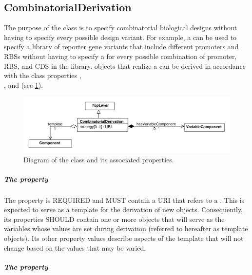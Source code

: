\subsection{CombinatorialDerivation}
\label{sec:CombinatorialDerivation}

The purpose of the  class is to specify combinatorial biological designs without having to specify every possible design variant. For example, a  can be used to specify a library of reporter gene variants that include different promoters and RBSs without having to specify a  for every possible combination of promoter, RBS, and CDS in the library.  objects that realize a  can be derived in accordance with the class properties , \\
, and  (see \ref{uml:combinatorial_derivation}).

\begin{figure}[ht]
\begin{center}
\includegraphics[scale=0.6]{uml/combinatorial_derivation}
\caption[]{Diagram of the  class and its associated properties.}
\label{uml:combinatorial_derivation}
\end{center}
\end{figure}

\subparagraph{The  property}\label{sec:template}

The  property is REQUIRED and MUST contain a URI that refers to a . 
This  is expected to serve as a template for the derivation of new  objects. 
Consequently, its  properties SHOULD contain one or more  objects that will serve as the variables whose values are set during derivation (referred to hereafter as template  objects).
Its other property values describe aspects of the template that will not change based on the values that may be varied.

\subparagraph{The  property}
\label{sec:hasVariableFeature}

